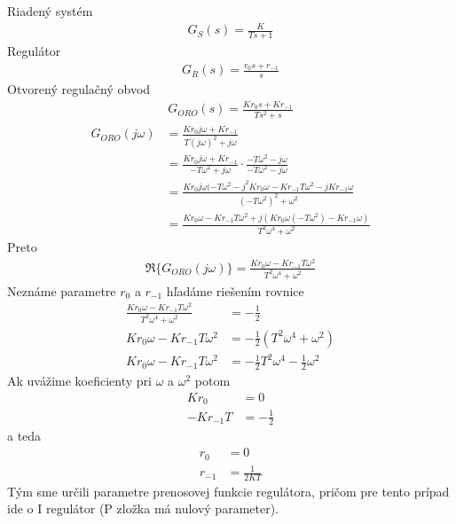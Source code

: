 \documentclass[a4paper, 10pt, ]{article}
\begin{document}
Riadený systém
\begin{align}
    G_S(s) = \frac{K}{Ts+1}
\end{align}
Regulátor
\begin{align}
    G_R(s) = \frac{r_0 s + r_{-1}}{s}
\end{align}
Otvorený regulačný obvod
\begin{align}
    G_{ORO}(s) = \frac{K r_0 s + K r_{-1}}{T s^2 + s}
\end{align}
\begin{equation}
    \begin{aligned}
        G_{ORO} (j\omega)
        &=
        \frac{K r_0 j\omega + K r_{-1}}{T (j\omega)^2 + j\omega} 
        \\
        &=
        \frac{K r_0 j\omega + K r_{-1}}{ -T \omega^2 + j\omega} \cdot \frac{-T\omega^2 - j\omega}{-T\omega^2 - j\omega}
        \\
        &=
        \frac{K r_0 j \omega (-T\omega^2 - j^2 K r_0 \omega - K r_{-1} T \omega^2 - j K r_{-1} \omega   }{ \left( -T\omega^2 \right)^2 + \omega^2   }
        \\
        &=
        \frac{K r_0 \omega - K r_{-1} T \omega^2 + j \left( K r_0\omega (-T\omega^2) - K r_{-1} \omega   \right)   }{ T^2\omega^4 + \omega^2   }
    \end{aligned}
\end{equation}
Preto
\begin{align}
    \Re \bigl\{ G_{ORO}(j\omega) \bigl\} = \frac{K r_0 \omega - K r_{-1} T \omega^2    }{ T^2\omega^4 + \omega^2   }
\end{align}
Neznáme parametre $r_0$ a $r_{-1}$ hľadáme riešením rovnice
\begin{align}
    \frac{K r_0 \omega - K r_{-1} T \omega^2    }{ T^2\omega^4 + \omega^2   } &= -\frac{1}{2} \\
    K r_0 \omega - K r_{-1} T \omega^2     &= -\frac{1}{2} \left( T^2\omega^4 + \omega^2  \right) \\
    K r_0 \omega - K r_{-1} T \omega^2     &= -\frac{1}{2} T^2\omega^4 -\frac{1}{2} \omega^2  
\end{align}
Ak uvážime koeficienty pri $\omega$ a $\omega^2$ potom
\begin{align}
    K r_0 &= 0 \\
    - K r_{-1} T &= -\frac{1}{2}
\end{align}
a teda
\begin{align}
    r_0 &= 0 \\
    r_{-1}  &= \frac{1}{2KT}
\end{align}
Tým sme určili parametre prenosovej funkcie regulátora, pričom pre tento prípad ide o I regulátor (P zložka má nulový parameter).
\end{document}

